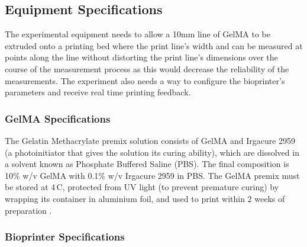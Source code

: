 \subsection{Equipment Specifications}
The experimental equipment needs to allow a 10mm line of GelMA to be extruded onto a printing bed where the print line’s width and can be measured at points along the line without distorting the print line’s dimensions over the course of the measurement process as this would decrease the reliability of the measurements. The experiment also needs a way to configure the bioprinter’s parameters and receive real time printing feedback.


\subsubsection*{GelMA Specifications}

The Gelatin Methacrylate premix solution consists of GelMA and Irgacure 2959 (a photoinitiator that gives the solution its curing ability), which are dissolved in a solvent known as Phosphate Buffered Saline (PBS). The final composition is 10\% w/v GelMA with 0.1\% w/v Irgacure 2959 in PBS. The GelMA premix must be stored at 4\,\textdegree{}C, protected from UV light (to prevent premature curing) by wrapping its container in aluminium foil, and used to print within 2 weeks of preparation \citep{gelma_protocol}.

\subsubsection*{Bioprinter Specifications}

